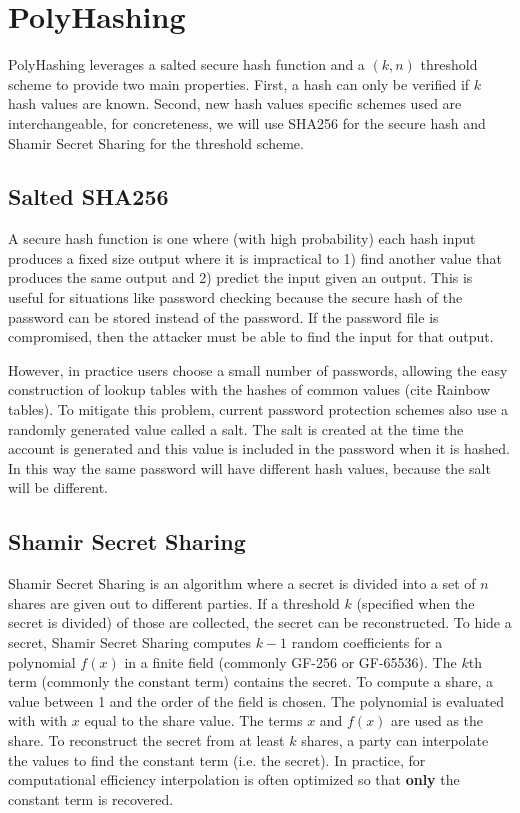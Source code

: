 \section{PolyHashing}
\label{sec-polyhashing}

PolyHashing leverages a salted secure hash function and a $(k,n)$ threshold 
scheme to provide two main properties.   First, a hash can only be 
verified if $k$ hash values are known.   Second, new hash values 
specific schemes used are interchangeable, for concreteness, we will use
SHA256 for the secure hash and Shamir Secret Sharing for the threshold scheme.

\subsection{Salted SHA256}

A secure hash function is one where (with high probability) each hash input
produces a fixed size output where it is impractical to 1) find another
value that produces the same output and 2) predict the input given an output.
This is useful for situations like password checking because the secure
hash of the password can be stored instead of the password.   If the password
file is compromised, then the attacker must be able to find the input for that
output.   

However, in practice users choose a small number of passwords, allowing the
easy construction of lookup tables with the hashes of common values (cite
Rainbow tables).   To mitigate this problem, current password protection
schemes also use a randomly generated value called a salt.   The salt is
created at the time the account is generated and this value is included in
the password when it is hashed.   In this way the same password will have 
different hash values, because the salt will be different.


\subsection{Shamir Secret Sharing}

Shamir Secret Sharing\cite{shamir1979share} is an algorithm where a
secret is divided into a set of $n$ shares are given out to different parties.  
If a threshold $k$ (specified when the secret is divided) of those are 
collected, the secret can be reconstructed.   To hide a secret, Shamir Secret 
Sharing computes $k-1$ random coefficients for a polynomial $f(x)$ in
a finite field (commonly GF-256 or GF-65536).   The $k$th term (commonly the
constant term) contains the secret.  
 To compute a share, a value between 1
and the order of the field is chosen.   The polynomial is evaluated with
with $x$ equal to the share value.   The terms $x$ and $f(x)$ are used as the
share.   To reconstruct the secret from at least $k$ shares, a party can
interpolate the values to find the constant term (i.e. the secret).   In
practice, for computational efficiency interpolation is often optimized so 
that {\bf only} the constant term is recovered.

